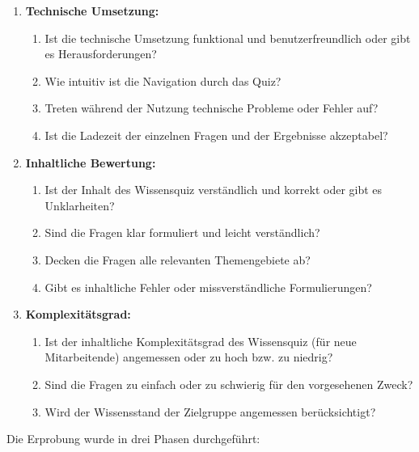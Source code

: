 \begin{enumerate}
    \item \textbf{Technische Umsetzung:}
    \begin{enumerate}
        \item Ist die technische Umsetzung funktional und benutzerfreundlich oder gibt es Herausforderungen?
        \item Wie intuitiv ist die Navigation durch das Quiz?
        \item Treten während der Nutzung technische Probleme oder Fehler auf?
        \item Ist die Ladezeit der einzelnen Fragen und der Ergebnisse akzeptabel?
    \end{enumerate}
    \item \textbf{Inhaltliche Bewertung:}
    \begin{enumerate}
        \item Ist der Inhalt des Wissensquiz verständlich und korrekt oder gibt es Unklarheiten?
        \item Sind die Fragen klar formuliert und leicht verständlich?
        \item Decken die Fragen alle relevanten Themengebiete ab?
        \item Gibt es inhaltliche Fehler oder missverständliche Formulierungen?
    \end{enumerate}
    \item \textbf{Komplexitätsgrad:}
    \begin{enumerate}
        \item Ist der inhaltliche Komplexitätsgrad des Wissensquiz (für neue Mitarbeitende) angemessen oder zu hoch bzw. zu niedrig?
        \item Sind die Fragen zu einfach oder zu schwierig für den vorgesehenen Zweck?
        \item Wird der Wissensstand der Zielgruppe angemessen berücksichtigt?
    \end{enumerate}
\end{enumerate}

Die Erprobung wurde in drei Phasen durchgeführt:

